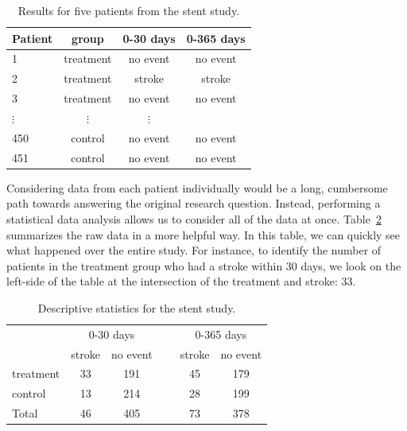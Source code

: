 \begin{table}[h]
\centering
\begin{tabular}{l ccc}
\hline
Patient	&	group	&	0-30 days 	&	0-365 days \\
\hline
1		&	treatment &	no event &	no event \\
2		&	treatment &	stroke & stroke \\
3		&	treatment &	no event & no event \\
$\vdots$	&	$\vdots$	  &	$\vdots$ \\
450	&	control &	no event &	no event \\
451	&	control &	no event &	no event \\
\hline
\end{tabular}
\caption{Results for five patients from the stent study.}
\label{stentStudyResultsDF}
\end{table}

Considering data from each patient individually would be a long, cumbersome path towards answering the original research question. Instead, performing a statistical data analysis allows us to consider all of the data at once. Table~\ref{stentStudyResults} summarizes the raw data in a more helpful way. In this table, we can quickly see what happened over the entire study. For instance, to identify the number of patients in the treatment group who had a stroke within 30 days, we look on the left-side of the table at the intersection of the treatment and stroke: 33.

\begin{table}[h]
\centering
\begin{tabular}{l cc c cc}
& \multicolumn{2}{c}{0-30 days} &\hspace{5mm}\ & \multicolumn{2}{c}{0-365 days} \\
  \cline{2-3} \cline{5-6}
	& 	stroke 	& no event && 	stroke 	& no event \\
  \hline
treatment 	& 33		& 191	&&	45 	& 179 \\
control 		& 13		& 214	&& 	28	& 199 \\
  \hline
Total				& 46		& 405	&&	73	& 378 \\
  \hline
\end{tabular}
\caption{Descriptive statistics for the stent study.}
\label{stentStudyResults}
\end{table}

